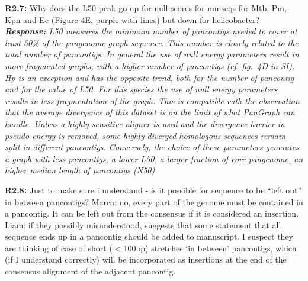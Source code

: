 \documentclass[aps,rmp,onecolumn]{revtex4-1}
\newcommand{\Marco}[1]{{\color{gray}Marco: #1}}
\newcommand{\Liam}[1]{{\color{teal}Liam: #1}}
\newcommand{\reviewer}[2]{\textbf{#1:} #2\vskip 5mm}
\newcommand{\response}[1]{{\it {\color{response}\textbf{Response:} #1}}\vskip 5mm}
\begin{document}
\reviewer{R2.7}{Why does the L50 peak go up for null-scores for mmseqs for Mtb, Pm, Kpn and Ec (Figure 4E, purple with lines) but down for helicobacter?}
\response{L50 measures the minimum number of pancontigs needed to cover at least 50\% of the pangenome graph sequence. This number is closely related to the total number of pancontigs. In general the use of null energy parameters result in more fragmented graphs, with a higher number of pancontigs (cf. fig.~4D in SI). Hp is an exception and has the opposite trend, both for the number of pancontig and for the value of L50. For this species the use of null energy parameters results in less fragmentation of the graph. This is compatible with the observation that the average divergence of this dataset is on the limit of what PanGraph can handle. Unless a highly sensitive aligner is used and the divergence barrier in pseudo-energy is removed, some highly-diverged homologous sequences remain split in different pancontigs. Conversely, the choice of these parameters generates a graph with less pancontigs, a lower L50, a larger fraction of core pangenome, an higher median length of pancontigs (N50).
}

\reviewer{R2.8}{Just to make sure i understand - is it possible for sequence to be ``left out'' in between pancontigs?}
\Marco{no, every part of the genome must be contained in a pancontig. It can be left out from the consensus if it is considered an insertion.}\\
\Liam{if they possibly misunderstood, suggests that some statement that all sequence ends up in a pancontig should be added to manuscript. I suspect they are thinking of case of short ($<$100bp) stretches `in between' pancontigs, which (if I understand correctly) will be incorporated as insertions at the end of the consensus alignment of the adjacent pancontig.}
\end{document}
